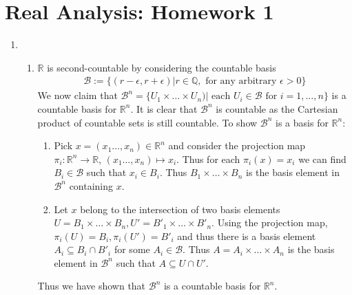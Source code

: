 \documentclass[a4paper,12pt]{article}
\theoremstyle{definition}
\begin{document}
\section*{Real Analysis: Homework 1}

\begin{enumerate}

\item
\begin{enumerate}
\item $\mathbb{R}$ is second-countable by considering the countable basis 
\begin{align*}
\mathcal{B}:=\{(r-\epsilon,r+\epsilon)| r \in \mathbb{Q}, \text{ for any arbitrary }\epsilon >0\}
\end{align*}
We now claim that $\mathcal{B}^n = \{U_1\times \ldots\times U_n)|\text{ each }U_i\in \mathcal{B}\text{ for }i=1,\ldots, n\}$ is a countable basis for $\mathbb{R}^n$. It is clear that $\mathcal{B}^n$ is countable as the Cartesian product of countable sets is still countable. To show $\mathcal{B}^n$ is a basis for $\mathbb{R}^n$:
\begin{enumerate}[(1)]
\item Pick $x = (x_1\ldots, x_n) \in \mathbb{R}^n$ and consider the projection map $\pi_i: \mathbb{R}^n \to \mathbb{R}$, $(x_1\ldots, x_n) \mapsto x_i$. Thus for each $\pi_i(x) = x_i$ we can find $B_i \in \mathcal{B}$ such that $x_i \in B_i$. Thus $B_1 \times \ldots \times B_n$ is the basis element in $\mathcal{B}^n$ containing $x$.
\item Let $x$ belong to the intersection of two basis elements $U = B_1 \times \ldots \times B_n, U' = B'_1 \times \ldots \times B'_n$. Using the projection map, $\pi_i(U) = B_i, \pi_i(U') = B'_i$ and thus there is a basis element $A_i \subseteq B_i \cap B'_i$ for some $A_i \in \mathcal{B}$. Thus $A = A_i \times \ldots \times A_n$ is the basis element in $\mathcal{B}^n$ such that $A \subseteq U \cap U'$.
\end{enumerate}
Thus we have shown that $\mathcal{B}^n$ is a countable basis for $\mathbb{R}^n$.




\end{enumerate}
\end{enumerate}
\end{document}
